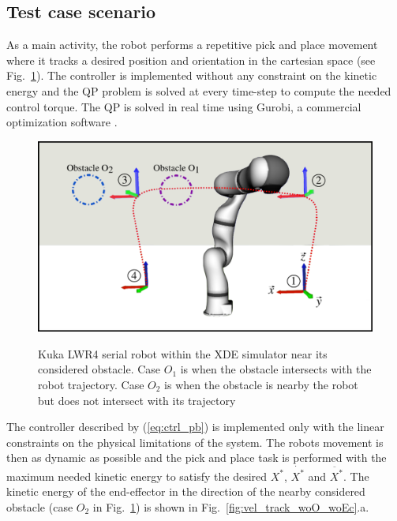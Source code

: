 \documentclass[a4paper, 10pt, conference]{ieeeconf}      %
\begin{document}
\subsection{Test case scenario}
As a main activity, the robot performs a repetitive pick and place movement where it tracks a desired position and orientation in the cartesian space (see Fig.~\ref{fig:kuka_in_xde}). The controller is implemented without any constraint on the kinetic energy and the QP problem is solved at every time-step to compute the needed control torque. The QP is solved in real time using Gurobi, a commercial optimization software \cite{gurobi}.

\begin{figure}[h]
\centering
{\includegraphics[width=0.9\columnwidth]{figures/kuka_in_xde}}
\caption{Kuka LWR4 serial robot within the XDE simulator near its considered obstacle. Case $O_1$ is when the obstacle intersects with the robot trajectory. Case $O_2$ is when the obstacle is nearby the robot but does not intersect with its trajectory} 
\label{fig:kuka_in_xde}
\end{figure}

The controller described by (\ref{eq:ctrl_pb}) is implemented only with the linear constraints on the physical limitations of the system. The robots  movement is then as dynamic as possible and the pick and place task is performed with the maximum needed kinetic energy to satisfy the desired $X^*$, $\dot{X^*}$ and $\ddot{X^*}$. The kinetic energy of the end-effector in the direction of the nearby considered obstacle (case $O_2$ in Fig.~\ref{fig:kuka_in_xde}) is shown in Fig.~\ref{fig:vel_track_woO_woEc}.a. 
\end{document}
